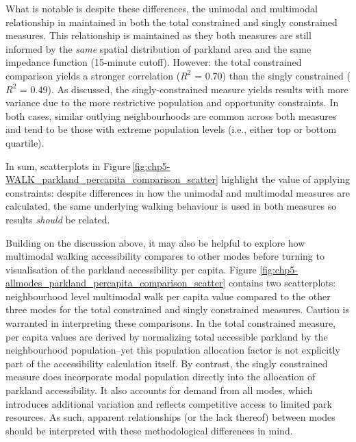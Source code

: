\documentclass[
11pt, %
oneside, %
english, %
singlespacing, %
]{macthesis} %
\begin{document}
What is notable is despite these differences, the unimodal and multimodal relationship in maintained in both the total constrained and singly constrained measures. This relationship is maintained as they both measures are still informed by the \emph{same} spatial distribution of parkland area and the same impedance function (15-minute cutoff). However: the total constrained comparison yields a stronger correlation (\(R^2\) = 0.70) than the singly constrained (\(R^2\) = 0.49). As discussed, the singly-constrained measure yields results with more variance due to the more restrictive population and opportunity constraints. In both cases, similar outlying neighbourhoods are common across both measures and tend to be those with extreme population levels (i.e., either top or bottom quartile).

In sum, scatterplots in Figure\,\ref{fig:chp5-WALK_parkland_percapita_comparison_scatter} highlight the value of applying constraints: despite differences in how the unimodal and multimodal measures are calculated, the same underlying walking behaviour is used in both measures so results \emph{should} be related.

Building on the discussion above, it may also be helpful to explore how multimodal walking accessibility compares to other modes before turning to visualisation of the parkland accessibility per capita. Figure \ref{fig:chp5-allmodes_parkland_percapita_comparison_scatter} contains two scatterplots: neighbourhood level multimodal walk per capita value compared to the other three modes for the total constrained and singly constrained measures. Caution is warranted in interpreting these comparisons. In the total constrained measure, per capita values are derived by normalizing total accessible parkland by the neighbourhood population--yet this population allocation factor is not explicitly part of the accessibility calculation itself. By contrast, the singly constrained measure does incorporate modal population directly into the allocation of parkland accessibility. It also accounts for demand from all modes, which introduces additional variation and reflects competitive access to limited park resources. As such, apparent relationships (or the lack thereof) between modes should be interpreted with these methodological differences in mind.
\end{document}
